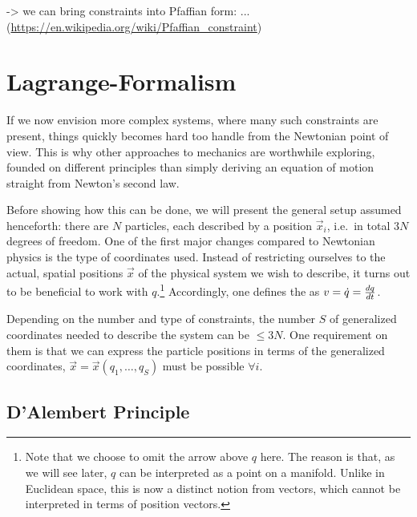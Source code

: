\documentclass[../class_mech_main.tex]{subfiles}
\begin{document}
-> we can bring constraints into Pfaffian form: ... (\url{https://en.wikipedia.org/wiki/Pfaffian_constraint})






	\section{Lagrange-Formalism}
If we now envision more complex systems, where many such constraints are present, things quickly becomes hard too handle from the Newtonian point of view. This is why other approaches to mechanics are worthwhile exploring, founded on different principles than simply deriving an equation of motion straight from Newton's second law.


Before showing how this can be done, we will present the general setup assumed henceforth: there are $N$ particles, each described by a position $\vec{x}_i$, i.e.~in total $3 N$ degrees of freedom. One of the first major changes compared to Newtonian physics is the type of coordinates used. Instead of restricting ourselves to the actual, spatial positions $\vec{x}$ of the physical system we wish to describe, it turns out to be beneficial to work with  $q$.\footnote{Note that we choose to omit the arrow above $q$ here. The reason is that, as we will see later, $q$ can be interpreted as a point on a manifold. Unlike in Euclidean space, this is now a distinct notion from vectors, which cannot be interpreted in terms of position vectors.} Accordingly, one defines the  as $v = \dot{q} = \dv{q}{t}$.


Depending on the number and type of constraints, the number $S$ of generalized coordinates needed to describe the system can be $\leq 3N$. One requirement on them is that we can express the particle positions in terms of the generalized coordinates, $\vec{x} = \vec{x}(q_1, \dots, q_S)$ must be possible $\forall i$.




		\subsection{D'Alembert Principle}
\end{document}
